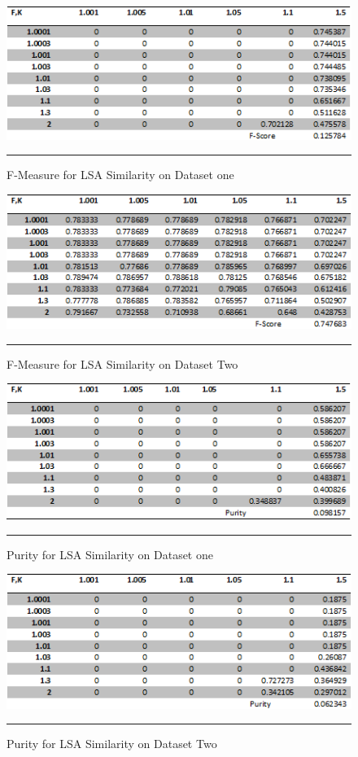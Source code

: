 \begin{figure}[htbp]
	\centering
		\includegraphics{./Figures/lsa_F_DS1.png}
		\rule{35em}{0.5pt}
	\caption[F-Measure for LSA Similarity on Dataset one]{F-Measure for LSA Similarity on Dataset one}
	\label{fig:F1}
\end{figure}

\begin{figure}[htbp]
	\centering
		\includegraphics{./Figures/lsa_F_DS2.png}
		\rule{35em}{0.5pt}
	\caption[F-Measure for LSA Similarity on Dataset Two]{F-Measure for LSA Similarity on Dataset Two}
	\label{fig:F2}
\end{figure}

\begin{figure}[htbp]
	\centering
		\includegraphics{./Figures/lsa_Purity_DS1.png}
		\rule{35em}{0.5pt}
	\caption[Purity for LSA Similarity on Dataset one]{Purity for LSA Similarity on Dataset one}
	\label{fig:F3}
\end{figure}

\begin{figure}[htbp]
	\centering
		\includegraphics{./Figures/lsa_Purity_DS2.png}
		\rule{35em}{0.5pt}
	\caption[Purity for LSA Similarity on Dataset Two]{Purity for LSA Similarity on Dataset Two}
	\label{fig:F4}
\end{figure}

